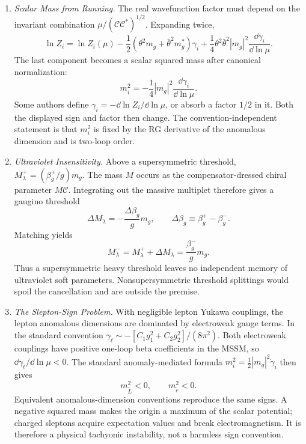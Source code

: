 \begin{enumerate}
  \begin{enumerate}
    \item \emph{Scalar Mass from Running.}
    The real wavefunction factor must depend on the invariant combination
      \(\mu/(\mathcal C\mathcal C^*)^{1/2}\).  Expanding twice,
      \[
        \ln Z_i
          =\ln Z_i(\mu)
           -\frac12(\theta^2m_g+\bar\theta^2m_g^*)\gamma_i
           +\frac14\theta^2\bar\theta^2|m_g|^2
             \frac{\dd\gamma_i}{\dd\ln\mu}.
      \]
      The last component becomes a scalar squared mass after canonical
      normalization:
      \[
        m_i^2=-\frac14|m_g|^2\frac{\dd\gamma_i}{\dd\ln\mu}.
      \]
      Some authors define \(\gamma_i=-\dd\ln Z_i/\dd\ln\mu\), or absorb a
      factor \(1/2\) in it.  Both the displayed sign and factor then change.
      The convention-independent statement is that \(m_i^2\) is fixed by
      the RG derivative of the anomalous dimension and is two-loop order.
    \item \emph{Ultraviolet Insensitivity.}
    Above a supersymmetric threshold,
      \(M_\lambda^+=(\beta_g^+/g)m_g\).  The mass \(M\) occurs as the
      compensator-dressed chiral parameter \(M\mathcal C\).  Integrating out
      the massive multiplet therefore gives a gaugino threshold
      \[
        \Delta M_\lambda
          =-\frac{\Delta\beta_g}{g}m_g,\qquad
        \Delta\beta_g\equiv\beta_g^+-\beta_g^-.
      \]
      Matching yields
      \[
        M_\lambda^-
          =M_\lambda^++\Delta M_\lambda
          =\frac{\beta_g^-}{g}m_g.
      \]
      Thus a supersymmetric heavy threshold leaves no independent memory of
      ultraviolet soft parameters.  Nonsupersymmetric threshold splittings
      would spoil the cancellation and are outside the premise.
    \item \emph{The Slepton-Sign Problem.}
    With negligible lepton Yukawa couplings, the lepton anomalous
      dimensions are dominated by electroweak gauge terms.  In the standard
      convention
      \(\gamma_{\tilde\ell}\sim-[C_1g_1^2+C_2g_2^2]/(8\pi^2)\).
      Both electroweak couplings have positive one-loop beta coefficients in
      the MSSM, so \(\dd\gamma_{\tilde\ell}/\dd\ln\mu<0\).  The standard
      anomaly-mediated formula
      \(m_i^2=\tfrac12|m_g|^2\dot\gamma_i\) then gives
      \[
        m_{\tilde L}^2<0,\qquad m_{\tilde e}^2<0.
      \]
      Equivalent anomalous-dimension conventions reproduce the same signs.
      A negative squared mass makes the origin a maximum of the scalar
      potential; charged sleptons acquire expectation values and break
      electromagnetism.  It is therefore a physical tachyonic instability,
      not a harmless sign convention.
  \end{enumerate}


\end{enumerate}
